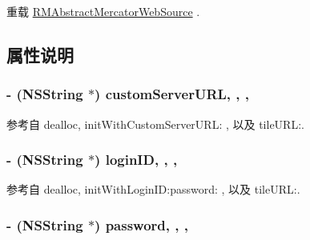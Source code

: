重载 \hyperlink{interface_r_m_abstract_mercator_web_source_acf45b84d8f39ef7fcc2a92a2e320a9a2}{R\-M\-Abstract\-Mercator\-Web\-Source} .



\subsection{属性说明}
\hypertarget{interface_r_m_spatial_cloud_map_source_a95993be286a23506999885f4f0dbbcb5}{
\subsubsection[{custom\-Server\-U\-R\-L}]{\setlength{\rightskip}{0pt plus 5cm}-\/ (N\-S\-String $\ast$) custom\-Server\-U\-R\-L\hspace{0.3cm}{\ttfamily [read]}, {\ttfamily [write]}, {\ttfamily [nonatomic]}, {\ttfamily [retain]}}}\label{interface_r_m_spatial_cloud_map_source_a95993be286a23506999885f4f0dbbcb5}


参考自 dealloc, init\-With\-Custom\-Server\-U\-R\-L\-: , 以及 tile\-U\-R\-L\-:.

\hypertarget{interface_r_m_spatial_cloud_map_source_a2fc06fe779fd193239b1f5d7e811695a}{
\subsubsection[{login\-I\-D}]{\setlength{\rightskip}{0pt plus 5cm}-\/ (N\-S\-String $\ast$) login\-I\-D\hspace{0.3cm}{\ttfamily [read]}, {\ttfamily [write]}, {\ttfamily [nonatomic]}, {\ttfamily [retain]}}}\label{interface_r_m_spatial_cloud_map_source_a2fc06fe779fd193239b1f5d7e811695a}


参考自 dealloc, init\-With\-Login\-I\-D\-:password\-: , 以及 tile\-U\-R\-L\-:.

\hypertarget{interface_r_m_spatial_cloud_map_source_a61b5267d19e420557cd924aaa1101147}{
\subsubsection[{password}]{\setlength{\rightskip}{0pt plus 5cm}-\/ (N\-S\-String $\ast$) password\hspace{0.3cm}{\ttfamily [read]}, {\ttfamily [write]}, {\ttfamily [nonatomic]}, {\ttfamily [retain]}}}\label{interface_r_m_spatial_cloud_map_source_a61b5267d19e420557cd924aaa1101147}


